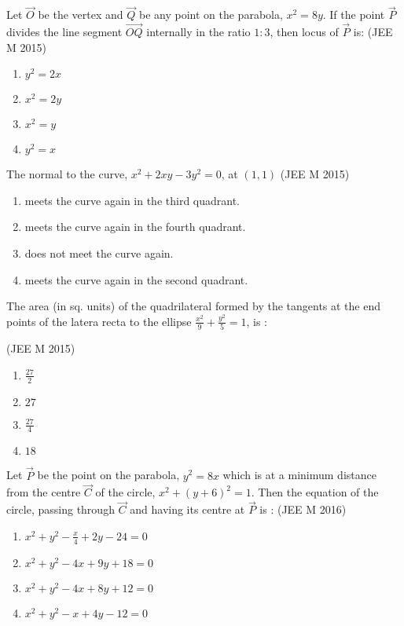     \item Let $\vec{O}$ be the vertex and $\vec{Q}$ be any point on the parabola, $x^2=8y$. If the point $\vec{P}$ divides the line segment $\vec{OQ}$ internally in the ratio $1:3$, then locus of $\vec{P}$ is:
    \hfill(JEE M 2015)
    \begin{enumerate}
    \item$y^2=2x$
    \item$x^2=2y$
    \item$x^2=y$
    \item$y^2=x$ 
    \end{enumerate}

    \item The normal to the curve, $x^2+2xy-3y^2=0$, at $(1,1)$
    \hfill(JEE M 2015)
    \begin{enumerate}
    \item meets the curve again in the third quadrant.
    \item meets the curve again in the fourth quadrant.
    \item does not meet the curve again.
    \item meets the curve again in the second quadrant.
    \end{enumerate}
    \item The area (in sq. units) of the quadrilateral formed by the tangents at the end points of the latera recta to the ellipse $\frac{x^2}{9}+\frac{y^2}{5}=1$, is :
    
    \hfill(JEE M 2015)
    \begin{enumerate}
    \item$\frac{27}{2}$
    \item$27$
    \item$\frac{27}{4}$
    \item$18$ 
    \end{enumerate}

    \item Let $\vec{P}$ be the point on the parabola, $y^2=8x$ which is at a minimum distance from the centre $\vec{C}$ of the circle, $x^2+(y+6)^2=1$. Then the equation of the circle, passing through $\vec{C}$ and having its centre at $\vec{P}$ is :
    \hfill(JEE M 2016)
    \begin{enumerate}
    \item $x^2+y^2-\frac{x}{4}+2y-24=0$
    \item $x^2+y^2-4x+9y+18=0$
    \item $x^2+y^2-4x+8y+12=0$
    \item $x^2+y^2-x+4y-12=0$
    \end{enumerate}
    
